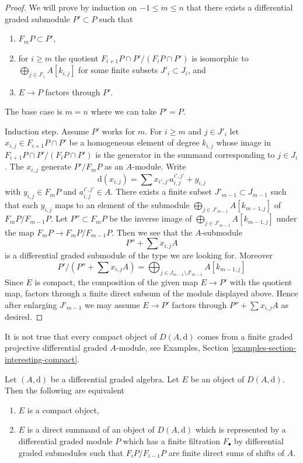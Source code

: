 \begin{proof}
We will prove by induction on $-1 \leq m \leq n$ that there exists
a differential graded submodule $P' \subset P$  such that
\begin{enumerate}
\item $F_mP \subset P'$,
\item for $i \geq m$ the quotient $F_{i + 1}P \cap P'/(F_iP \cap P')$ is
isomorphic to $\bigoplus_{j \in J'_i} A[k_{i, j}]$ for some finite subsets
$J'_i \subset J_i$, and
\item $E \to P$ factors through $P'$.
\end{enumerate}
The base case is $m = n$ where we can take $P' = P$.

\medskip\noindent
Induction step. Assume $P'$ works for $m$.
For $i \geq m$ and $j \in J'_i$ let $x_{i, j} \in F_{i + 1}P \cap P'$
be a homogeneous element of degree $k_{i, j}$ whose image in
$F_{i + 1}P \cap P'/(F_iP \cap P')$ is the generator in
the summand corresponding to $j \in J_i$. The
$x_{i, j}$ generate $P'/F_mP$ as an $A$-module. Write
$$
\text{d}(x_{i, j}) = \sum x_{i', j'} a_{i, j}^{i', j'} + y_{i, j}
$$
with $y_{i, j} \in F_mP$ and $a_{i, j}^{i', j'} \in A$.
There exists a finite subset
$J'_{m - 1} \subset J_{m - 1}$ such that each $y_{i, j}$ maps to
an element of the submodule $\bigoplus_{j \in J'_{m - 1}} A[k_{m - 1, j}]$
of $F_mP/F_{m - 1}P$. Let $P'' \subset F_mP$ be the inverse
image of $\bigoplus_{j \in J'_{m - 1}} A[k_{m - 1, j}]$ under
the map $F_mP \to F_mP/F_{m - 1}P$. Then we see that the $A$-submodule
$$
P'' + \sum x_{i, j}A
$$
is a differential graded submodule of the type we are looking for. Moreover
$$
P'/(P'' + \sum x_{i, j}A) =
\bigoplus\nolimits_{j \in J_{m - 1} \setminus J'_{m - 1}} A[k_{m - 1, j}]
$$
Since $E$ is compact, the composition of the given map $E \to P'$
with the quotient map, factors through a finite direct subsum of
the module displayed above. Hence after enlarging $J'_{m - 1}$
we may assume $E \to P'$ factors through
$P'' + \sum x_{i, j}A$ as desired.
\end{proof}

\noindent
It is not true that every compact object of $D(A, \text{d})$ comes
from a finite graded projective differential graded $A$-module,
see Examples, Section \ref{examples-section-interesting-compact}.

\begin{proposition}
\label{proposition-compact}
Let $(A, \text{d})$ be a differential graded algebra. Let $E$ be an
object of $D(A, \text{d})$. Then the following are equivalent
\begin{enumerate}
\item $E$ is a compact object,
\item $E$ is a direct summand of an object of $D(A, \text{d})$
which is represented by a differential graded module $P$ which
has a finite filtration $F_\bullet$ by differential graded submodules
such that $F_iP/F_{i - 1}P$ are finite direct sums of shifts of $A$.
\end{enumerate}
\end{proposition}

